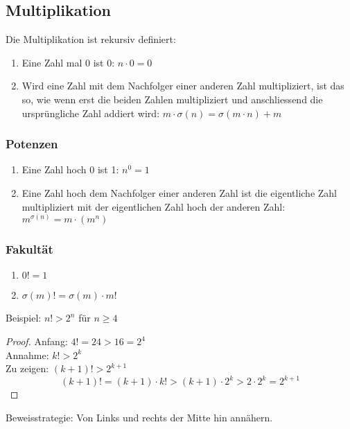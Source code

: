 \subsection{Multiplikation}
Die Multiplikation ist rekursiv definiert:
\begin{enumerate}
	\item Eine Zahl mal 0 ist 0: $n \cdot 0 = 0$\\
	\item Wird eine Zahl mit dem Nachfolger einer anderen Zahl multipliziert, ist das so, wie wenn
	erst die beiden Zahlen multipliziert und anschliessend die ursprüngliche Zahl addiert wird: $m \cdot \sigma(n) = \sigma(m \cdot n) + m$
\end{enumerate}

\subsubsection{Potenzen}
\begin{enumerate}
	\item Eine Zahl hoch 0 ist 1: $n^0 = 1$
	\item Eine Zahl hoch dem Nachfolger einer anderen Zahl ist die eigentliche Zahl multipliziert mit der eigentlichen Zahl hoch der anderen Zahl: $m^{\sigma(n)} = m \cdot (m^n)$
\end{enumerate}

\subsubsection{Fakultät}
\begin{enumerate}
	\item $0! = 1$
	\item $\sigma(m)! = \sigma(m) \cdot m!$
\end{enumerate}

Beispiel: $n! > 2^n$ für $n \geq 4$
\begin{proof}
	Anfang: $4! = 24 > 16 = 2^4$\\
	Annahme: $k! > 2^k$\\
	Zu zeigen: $(k + 1)! > 2^{k + 1}$
	\begin{equation*}
		(k + 1)! = (k + 1) \cdot k! > (k + 1) \cdot 2^k > 2 \cdot 2^k = 2^{k+1}
	\end{equation*}
\end{proof}
Beweisstrategie: Von Links und rechts der Mitte hin annähern.


